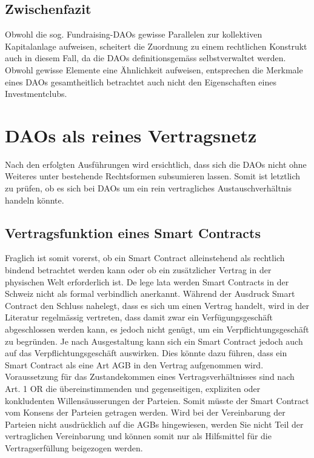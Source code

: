 \documentclass[a4paper,12pt]{report}
\begin{document}
	\subsection{Zwischenfazit}
	\startsubsection
	Obwohl die sog. Fundraising-DAOs gewisse Parallelen zur kollektiven Kapitalanlage aufweisen, scheitert die Zuordnung zu einem rechtlichen Konstrukt auch in diesem Fall, da die DAOs definitionsgemäss selbstverwaltet werden. Obwohl gewisse Elemente eine Ähnlichkeit aufweisen, entsprechen die Merkmale eines DAOs gesamtheitlich betrachtet auch nicht den Eigenschaften eines Investmentclubs.
	\closesection
	\closesection
	
	\section{DAOs als reines Vertragsnetz}
	\startsection
    Nach den erfolgten Ausführungen wird ersichtlich, dass sich die DAOs nicht ohne Weiteres unter bestehende Rechtsformen subsumieren lassen. Somit ist letztlich zu prüfen, ob es sich bei DAOs um ein rein vertragliches Austauschverhältnis handeln könnte. 
    
    \subsection{Vertragsfunktion eines Smart Contracts}
	\startsubsection
	Fraglich ist somit vorerst, ob ein Smart Contract alleinstehend als rechtlich bindend betrachtet werden kann oder ob ein zusätzlicher Vertrag in der physischen Welt erforderlich ist. De lege lata werden Smart Contracts in der Schweiz nicht als formal verbindlich anerkannt. Während der Ausdruck Smart Contract den Schluss nahelegt, dass es sich um einen Vertrag handelt, wird in der Literatur regelmässig vertreten, dass damit zwar ein Verfügungsgeschäft abgeschlossen werden kann, es jedoch nicht genügt, um ein Verpflichtungsgeschäft zu begründen.  Je nach Ausgestaltung kann sich ein Smart Contract jedoch auch auf das Verpflichtungsgeschäft auswirken. Dies könnte dazu führen, dass ein Smart Contract als eine Art AGB in den Vertrag aufgenommen wird. Voraussetzung für das Zustandekommen eines Vertragsverhältnisses sind nach Art. 1 OR die übereinstimmenden und gegenseitigen, expliziten oder konkludenten Willensäusserungen der Parteien. Somit müsste der Smart Contract vom Konsens der Parteien getragen werden. Wird bei der Vereinbarung der Parteien nicht ausdrücklich auf die AGBs hingewiesen, werden Sie nicht Teil der vertraglichen Vereinbarung und können somit nur als Hilfsmittel für die Vertragserfüllung beigezogen werden. 
    \closesection
\end{document}
